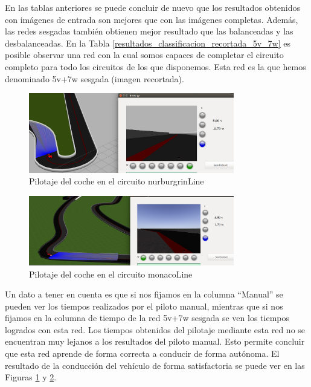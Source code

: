En las tablas anteriores se puede concluir de nuevo que los resultados obtenidos con imágenes de entrada son mejores que con las imágenes completas. Además, las redes sesgadas también obtienen mejor resultado que las balanceadas y las desbalanceadas. En la Tabla \ref{resultados_classificacion_recortada_5v_7w} es posible observar una red con la cual somos capaces de completar el circuito completo para todo los circuitos de los que disponemos. Esta red es la que hemos denominado 5v+7w sesgada (imagen recortada). \\

\begin{figure}
\begin{center}
	\includegraphics[width=0.8\textwidth]{figures/Clasificacion/nurburgrin_class.png}
   \caption{Pilotaje del coche en el circuito nurburgrinLine}
	\label{fig.nurburgrin_class}
\end{center}
\end{figure}

\begin{figure}
\begin{center}
	\includegraphics[width=0.8\textwidth]{figures/Clasificacion/monaco_class.png}
   \caption{Pilotaje del coche en el circuito monacoLine}
	\label{fig.monaco_class}
\end{center}
\end{figure}

Un dato a tener en cuenta es que si nos fijamos en la columna ``Manual'' se pueden ver los tiempos realizados por el piloto manual, mientras que si nos fijamos en la columna de tiempo de la red 5v+7w sesgada se ven los tiempos logrados con esta red. Los tiempos obtenidos del pilotaje mediante esta red no se encuentran muy lejanos a los resultados del piloto manual. Esto permite concluir que esta red aprende de forma correcta a conducir de forma autónoma. El resultado de la conducción del vehículo de forma satisfactoria se puede ver en las Figuras \ref{fig.nurburgrin_class} y \ref{fig.monaco_class}.\\



